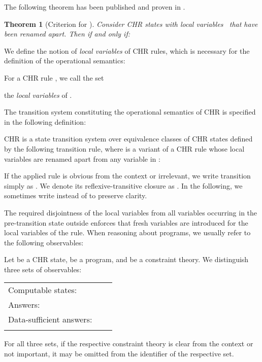 \documentclass[acmtocl]{acmtrans2m}
\newtheorem{theorem}{Theorem}[section]
\begin{document}
The following theorem has been published and proven in
\cite{Raiser2009a}.

\begin{theorem}[Criterion for ]\label{thm:sq_crit}
\label{thm:criterion}
Consider CHR states  with local variables~ that have been renamed apart. Then 
\emph{if and only if}:

\end{theorem}

We define the notion of \emph{local variables} of CHR rules, which is necessary
for the definition of the operational semantics:

\begin{definition}
For a CHR rule , we
call the set

the \emph{local variables} of .
\end{definition}


The transition system constituting the operational semantics of CHR is specified in the following
definition:

\begin{definition}
\label{def:chr-op-sem}

CHR is a state transition system over equivalence classes of CHR states defined
by the following transition rule, where  is a variant of a CHR rule whose local variables 
are renamed apart from any variable in :
\medskip


\medskip
If the applied rule is obvious from the context or irrelevant, we write
transition simply as . We denote its reflexive-transitive closure as
. In the following, we sometimes write  instead of
 to preserve clarity.
\end{definition}

The required disjointness of the local variables  from all variables
occurring in the pre-transition state outside  enforces that fresh variables
are introduced for the local variables of the rule. When reasoning about
programs, we usually refer to the following observables:

\begin{definition}
\label{def:observables}
Let  be a CHR state,  be a program, and  be a constraint theory. We
distinguish three sets of observables:

\begin{tabular}{l @{\quad} r @{} l}
\\
Computable states:  &  &
 \\
Answers: &  &
 \\
Data-sufficient answers: &  &
 \\
\\
\end{tabular}

For all three sets, if the respective constraint theory  is clear from the
context or not important, it may be omitted from the  identifier of the
respective set.
\end{definition}
\end{document}
